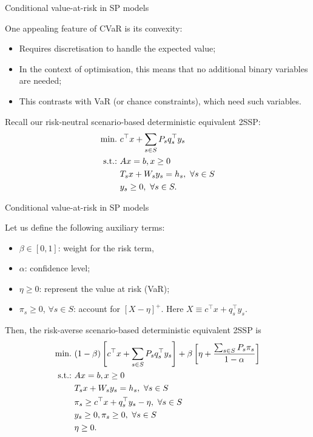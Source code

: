 

\begin{frame}{Conditional value-at-risk in SP models}

	One appealing feature of CVaR is its convexity:
	\begin{itemize}
		\item Requires discretisation to handle the expected value;
		\item In the context of optimisation, this means that \alert{no additional binary variables} are needed;
		\item This contrasts with VaR (or chance constraints), which need such variables.
	\end{itemize}
	
	\pause
	Recall our \alert{risk-neutral} scenario-based deterministic equivalent 2SSP:
	\begin{align*}
		\mathop{\text{min.} \ }  & c^\top x + \sum_{s\in S} P_s q_s^\top y_s \\
		\mathop{\text{s.t.:} \ }	   & Ax = b, x \ge 0 \\
			   & T_sx + W_s y_s = h_s, \ \forall s \in S \\
			   & y_s \ge 0, \ \forall s \in S.
	\end{align*}
	
\end{frame}


\begin{frame}{Conditional value-at-risk in SP models}

	Let us define the following auxiliary terms:
	\vspace{-6pt}
	\begin{itemize}
		\item $\beta \in [0,1]$: weight for the risk term, 
		\item $\alpha$: confidence level;
		\item $\eta \ge 0$: represent the value at risk (VaR); 
		\item $\pi_s \ge 0$, $\forall s \in S$: account for $[X - \eta]^+$. Here $X \equiv c^\top x + q_s^\top y_s$.   
	\end{itemize}
	\pause
	Then, the \alert{risk-averse} scenario-based deterministic equivalent 2SSP is
	\begin{align*}
		\mathop{\text{min.} \ }  & (1-\beta)\left[ c^\top x + \sum_{s\in S} P_s q_s^\top y_s \right] + \beta\left[ \eta + \frac{\sum_{s \in S} P_s \pi_s}{1-\alpha} \right] \\
		\mathop{\text{s.t.:} \ }	   & Ax = b, x \ge 0 \\
			   & T_sx + W_s y_s = h_s, \ \forall s \in S \\
			   & \pi_s \ge c^\top x + q_s^\top y_s - \eta, \ \forall s \in S \\
			   & y_s \ge 0, \pi_s \ge 0, \ \forall s \in S \\
			   & \eta \ge 0.
	\end{align*}
\end{frame}



